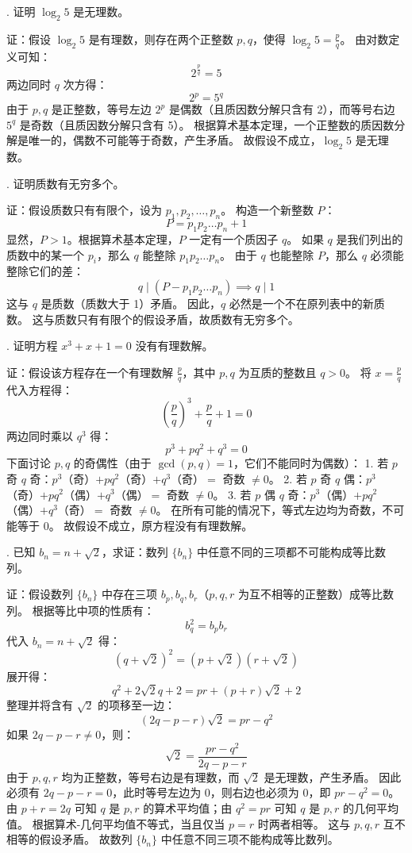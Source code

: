 \begin{questions}
. 证明 $\log_2 5$ 是无理数。

\begin{solution}
证：假设 $\log_2 5$ 是有理数，则存在两个正整数 $p, q$，使得 $\log_2 5 = \frac{p}{q}$。
由对数定义可知：
\[
2^{\frac{p}{q}} = 5
\]
两边同时 $q$ 次方得：
\[
2^p = 5^q
\]
由于 $p, q$ 是正整数，等号左边 $2^p$ 是偶数（且质因数分解只含有 2），而等号右边 $5^q$ 是奇数（且质因数分解只含有 5）。
根据算术基本定理，一个正整数的质因数分解是唯一的，偶数不可能等于奇数，产生矛盾。
故假设不成立，$\log_2 5$ 是无理数。
\end{solution}

. 证明质数有无穷多个。

\begin{solution}
证：假设质数只有有限个，设为 $p_1, p_2, \dots, p_n$。
构造一个新整数 $P$：
\[
P = p_1 p_2 \dots p_n + 1
\]
显然，$P > 1$。根据算术基本定理，$P$ 一定有一个质因子 $q$。
如果 $q$ 是我们列出的质数中的某一个 $p_i$，那么 $q$ 能整除 $p_1 p_2 \dots p_n$。
由于 $q$ 也能整除 $P$，那么 $q$ 必须能整除它们的差：
\[
q \mid (P - p_1 p_2 \dots p_n) \implies q \mid 1
\]
这与 $q$ 是质数（质数大于 1）矛盾。
因此，$q$ 必然是一个不在原列表中的新质数。
这与质数只有有限个的假设矛盾，故质数有无穷多个。
\end{solution}

. 证明方程 $x^3 + x + 1 = 0$ 没有有理数解。

\begin{solution}
证：假设该方程存在一个有理数解 $\frac{p}{q}$，其中 $p, q$ 为互质的整数且 $q > 0$。
将 $x = \frac{p}{q}$ 代入方程得：
\[
\left(\frac{p}{q}\right)^3 + \frac{p}{q} + 1 = 0
\]
两边同时乘以 $q^3$ 得：
\[
p^3 + pq^2 + q^3 = 0
\]
下面讨论 $p, q$ 的奇偶性（由于 $\gcd(p, q) = 1$，它们不能同时为偶数）：
1. 若 $p$ 奇 $q$ 奇：$p^3$（奇）$+ pq^2$（奇）$+ q^3$（奇）$=$ 奇数 $\neq 0$。
2. 若 $p$ 奇 $q$ 偶：$p^3$（奇）$+ pq^2$（偶）$+ q^3$（偶）$=$ 奇数 $\neq 0$。
3. 若 $p$ 偶 $q$ 奇：$p^3$（偶）$+ pq^2$（偶）$+ q^3$（奇）$=$ 奇数 $\neq 0$。
在所有可能的情况下，等式左边均为奇数，不可能等于 0。
故假设不成立，原方程没有有理数解。
\end{solution}

. 已知 $b_n = n + \sqrt{2}$，求证：数列 $\{b_n\}$ 中任意不同的三项都不可能构成等比数列。

\begin{solution}
证：假设数列 $\{b_n\}$ 中存在三项 $b_p, b_q, b_r$（$p, q, r$ 为互不相等的正整数）成等比数列。
根据等比中项的性质有：
\[
b_q^2 = b_p b_r
\]
代入 $b_n = n + \sqrt{2}$ 得：
\[
(q + \sqrt{2})^2 = (p + \sqrt{2})(r + \sqrt{2})
\]
展开得：
\[
q^2 + 2\sqrt{2}q + 2 = pr + (p + r)\sqrt{2} + 2
\]
整理并将含有 $\sqrt{2}$ 的项移至一边：
\[
(2q - p - r)\sqrt{2} = pr - q^2
\]
如果 $2q - p - r \neq 0$，则：
\[
\sqrt{2} = \frac{pr - q^2}{2q - p - r}
\]
由于 $p, q, r$ 均为正整数，等号右边是有理数，而 $\sqrt{2}$ 是无理数，产生矛盾。
因此必须有 $2q - p - r = 0$，此时等号左边为 0，则右边也必须为 0，即 $pr - q^2 = 0$。
由 $p + r = 2q$ 可知 $q$ 是 $p, r$ 的算术平均值；由 $q^2 = pr$ 可知 $q$ 是 $p, r$ 的几何平均值。
根据算术-几何平均值不等式，当且仅当 $p = r$ 时两者相等。
这与 $p, q, r$ 互不相等的假设矛盾。
故数列 $\{b_n\}$ 中任意不同三项不能构成等比数列。
\end{solution}


\end{questions}
